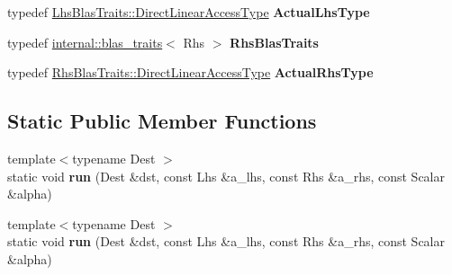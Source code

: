 \begin{DoxyCompactItemize}
\item 
\mbox{\label{struct_eigen_1_1internal_1_1selfadjoint__product__impl_3_01_lhs_00_01_lhs_mode_00_01false_00_01_0e7941e7b3bc2131c413f23ec856f76c_a9835d848b228177d3f1203c57f169176}} 
typedef \hyperlink{class_eigen_1_1internal_1_1_tensor_lazy_evaluator_writable}{Lhs\+Blas\+Traits\+::\+Direct\+Linear\+Access\+Type} {\bfseries Actual\+Lhs\+Type}
\item 
\mbox{\label{struct_eigen_1_1internal_1_1selfadjoint__product__impl_3_01_lhs_00_01_lhs_mode_00_01false_00_01_0e7941e7b3bc2131c413f23ec856f76c_af0af8f7c324b22f7d223d07ce9006807}} 
typedef \hyperlink{struct_eigen_1_1internal_1_1blas__traits}{internal\+::blas\+\_\+traits}$<$ Rhs $>$ {\bfseries Rhs\+Blas\+Traits}
\item 
\mbox{\label{struct_eigen_1_1internal_1_1selfadjoint__product__impl_3_01_lhs_00_01_lhs_mode_00_01false_00_01_0e7941e7b3bc2131c413f23ec856f76c_a91361b7706e773ff2e1f10721ec87637}} 
typedef \hyperlink{class_eigen_1_1internal_1_1_tensor_lazy_evaluator_writable}{Rhs\+Blas\+Traits\+::\+Direct\+Linear\+Access\+Type} {\bfseries Actual\+Rhs\+Type}
\end{DoxyCompactItemize}
\subsection*{Static Public Member Functions}
\begin{DoxyCompactItemize}
\item 
\mbox{\label{struct_eigen_1_1internal_1_1selfadjoint__product__impl_3_01_lhs_00_01_lhs_mode_00_01false_00_01_0e7941e7b3bc2131c413f23ec856f76c_aac01d65082977579764e985402319c55}} 
{\footnotesize template$<$typename Dest $>$ }\\static void {\bfseries run} (Dest \&dst, const Lhs \&a\+\_\+lhs, const Rhs \&a\+\_\+rhs, const Scalar \&alpha)
\item 
\mbox{\label{struct_eigen_1_1internal_1_1selfadjoint__product__impl_3_01_lhs_00_01_lhs_mode_00_01false_00_01_0e7941e7b3bc2131c413f23ec856f76c_aac01d65082977579764e985402319c55}} 
{\footnotesize template$<$typename Dest $>$ }\\static void {\bfseries run} (Dest \&dst, const Lhs \&a\+\_\+lhs, const Rhs \&a\+\_\+rhs, const Scalar \&alpha)
\end{DoxyCompactItemize}


